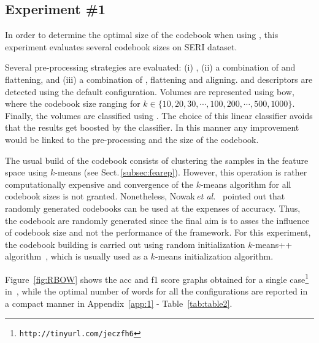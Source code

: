 \subsection{Experiment \#1}\label{subsec:exp1}
%
%
%
%

In order to determine the optimal size of the codebook when using \bow, this experiment evaluates several codebook sizes on SERI dataset.

Several pre-processing strategies are evaluated: (i) \nlm, (ii) a combination of \nlm and flattening, and (iii) a combination of \nlm, flattening and aligning.
\lbp and \lbptop descriptors are detected using the default configuration.
Volumes are represented using \ac{bow}, where the codebook size ranging for $k \in \{10, 20, 30, \cdots, 100, 200, \cdots, 500, 1000\}$.
Finally, the volumes are classified using \lr.
The choice of this linear classifier avoids that the results get boosted by the classifier. In this manner any improvement would be linked to the pre-processing and the size of the codebook.
%

The usual build of the codebook consists of clustering the samples in the feature space using $k$-means (see Sect.\,\ref{subsec:fearep}).
However, this operation is rather computationally expensive and convergence of the $k$-means algorithm for all codebook sizes is not granted.
Nonetheless, Nowak\,\textit{et al.}~\cite{nowak2006sampling} pointed out that randomly generated codebooks can be used at the expenses of accuracy.
Thus, the codebook are randomly generated since the final aim is to asses the influence of codebook size and not the performance of the framework.
For this experiment, the codebook building is carried out using random initialization $k$-means++ algorithm~\cite{arthur2007k}, which is usually used as a $k$-means initialization algorithm.

Figure~\ref{fig:RBOW} shows the \ac{acc} and \ac{f1} score graphs obtained for a single case\footnote{\texttt{http://tinyurl.com/jeczfh6}} in~\cite{Lemaitre2015}, while the optimal number of words for all the configurations are reported in a compact manner in Appendix~\ref{app:1} - Table~\ref{tab:table2}.

